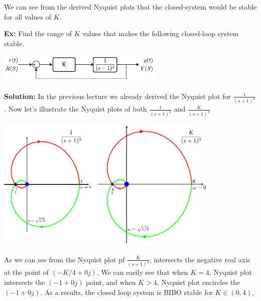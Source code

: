 \documentclass{article}
\begin{document}
\vspace{6 pt}

We can see from the derived Nyquist plots that the closed-system
would be stable for all values of $K$.

\vspace{6 pt}

\textbf{Ex:} Find the range of $K$ values that makes the
following closed-loop system stable. 

\vspace{6 pt}

  \begin{minipage}[h]{1\linewidth}
    \begin{center}
      \includegraphics[width=0.6\textwidth]{ex3block}
    \end{center}
  \end{minipage}

\vspace{6 pt}

\textbf{Solution:} In the previous lecture we already derived the
Nyquist plot for $\frac{1}{(s+1)^2}$. Now let's illustrate the Nyquist
plots of both $\frac{1}{(s+1)^2}$ and $\frac{K}{(s+1)^2}$

\vspace{6 pt}

  \begin{minipage}[h]{1\linewidth}
    \begin{center}
      \includegraphics[width=0.8\textwidth]{exK2}
    \end{center}
  \end{minipage}

\vspace{6 pt}

As we can see from the Nyquist plot pf $\frac{K}{(s+1)^3}$, 
intersects the negative real axis at the point of $(-K/4 + 0 j)$.
We can easily see that when $K = 4$, Nyquist plot intersects 
the $(-1 + 0 j)$ point, and when $K > 4$, Nyquist plot encircles 
the $(-1 + 0 j)$. As a results, the closed loop system is BIBO
stable for $K \in (0 , 4)$.
 
\end{document}
